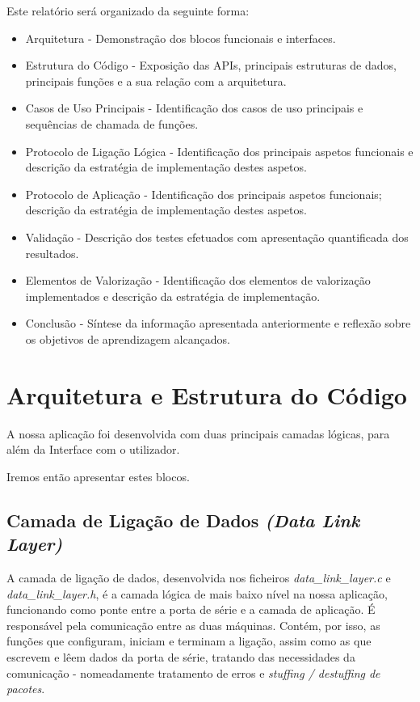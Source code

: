 \documentclass[11pt]{article}
\begin{document}
Este relatório será organizado da seguinte forma:
\begin{itemize}
\item Arquitetura - Demonstração dos blocos funcionais e interfaces.
\item Estrutura do Código - Exposição das APIs, principais estruturas de dados, principais funções e a sua relação com a arquitetura.
\item Casos de Uso Principais - Identificação dos casos de uso principais e sequências de chamada de funções.
\item Protocolo de Ligação Lógica - Identificação dos principais aspetos funcionais e descrição da estratégia de implementação destes aspetos. %
\item Protocolo de Aplicação - Identificação dos principais aspetos funcionais; descrição da estratégia de implementação destes aspetos. %
\item Validação - Descrição dos testes efetuados com apresentação quantificada dos resultados.
\item Elementos de Valorização - Identificação dos elementos de valorização implementados e descrição da estratégia de implementação. %
\item Conclusão - Síntese da informação apresentada anteriormente e reflexão sobre os objetivos de aprendizagem alcançados.
\end{itemize}


\newpage
\section{Arquitetura e Estrutura do Código}

A nossa aplicação foi desenvolvida com duas principais camadas lógicas, para além da Interface com o utilizador.

Iremos então apresentar estes blocos.

\subsection{Camada de Ligação de Dados \textit{(Data Link Layer)}}

A camada de ligação de dados, desenvolvida nos ficheiros \textit{data\_link\_layer.c} e \textit{data\_link\_layer.h}, é a camada lógica de mais baixo nível na nossa aplicação, funcionando como ponte entre a porta de série e a camada de aplicação. É responsável pela comunicação entre as duas máquinas. Contém, por isso, as funções que configuram, iniciam e terminam a ligação, assim como as que escrevem e lêem dados da porta de série, tratando das necessidades da comunicação - nomeadamente tratamento de erros e \textit{stuffing / destuffing de pacotes}.
\end{document}
